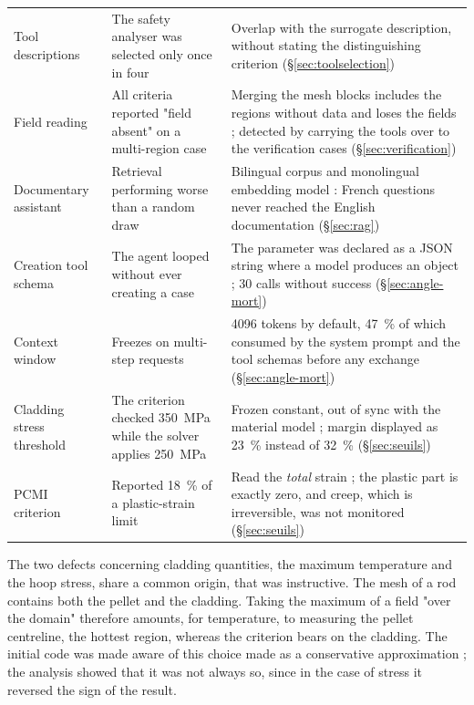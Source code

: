 \documentclass[12pt,a4paper]{report}
\begin{document}
\begin{table}[htbp]
\begin{tabularx}{\textwidth}{@{}>{\raggedright\arraybackslash}p{3.3cm}XX@{}}
\addlinespace
Tool descriptions & The safety analyser was selected only once in four &
  Overlap with the surrogate description, without stating the distinguishing
  criterion (§\ref{sec:toolselection})\\
\addlinespace
Field reading & All criteria reported "field absent" on a multi-region case &
  Merging the mesh blocks includes the regions without data and loses the
  fields ; detected by carrying the tools over to the verification cases
  (§\ref{sec:verification})\\
\addlinespace
Documentary assistant & Retrieval performing worse than a random draw &
  Bilingual corpus and monolingual embedding model : French questions never
  reached the English documentation (§\ref{sec:rag})\\
\addlinespace
Creation tool schema & The agent looped without ever creating a case & The
  parameter was declared as a JSON string where a model produces an object ;
  30 calls without success (§\ref{sec:angle-mort})\\
\addlinespace
Context window & Freezes on multi-step requests & \num{4096} tokens by default,
  \SI{47}{\percent} of which consumed by the system prompt and the tool schemas
  before any exchange (§\ref{sec:angle-mort})\\
\addlinespace
Cladding stress threshold & The criterion checked \SI{350}{\mega\pascal} while
  the solver applies \SI{250}{\mega\pascal} & Frozen constant, out of sync with
  the material model ; margin displayed as \SI{23}{\percent} instead of
  \SI{32}{\percent} (§\ref{sec:seuils})\\
\addlinespace
PCMI criterion & Reported \SI{18}{\percent} of a plastic-strain limit & Read the
  \emph{total} strain ; the plastic part is exactly zero, and creep, which is
  irreversible, was not monitored (§\ref{sec:seuils})\\
\bottomrule
\end{tabularx}
\end{table}

The two defects concerning cladding quantities, the maximum temperature and the
hoop stress, share a common origin, that was
instructive. The mesh of a rod contains both the pellet and the cladding. Taking
the maximum of a field "over the domain" therefore amounts, for temperature,
to measuring the pellet centreline, the hottest region, whereas the criterion
bears on the cladding. The initial code was made aware of this choice made as a conservative approximation ; the analysis showed that it was not
always so, since in the case of stress it reversed the sign of the result.
\end{document}

